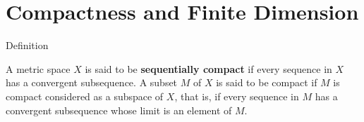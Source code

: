 \section{Compactness and Finite Dimension}

\begin{frame}{Definition}

\begin{definition}
    A metric space $X$ is said to be \textbf{sequentially compact} if every sequence in $X$ has a convergent subsequence. A subset $M$ of $X$ is said to be compact if $M$ is compact considered as a subspace of $X$, that is, if every sequence in $M$ has a convergent subsequence whose limit is an element of $M$.
\end{definition}
    
\end{frame}
